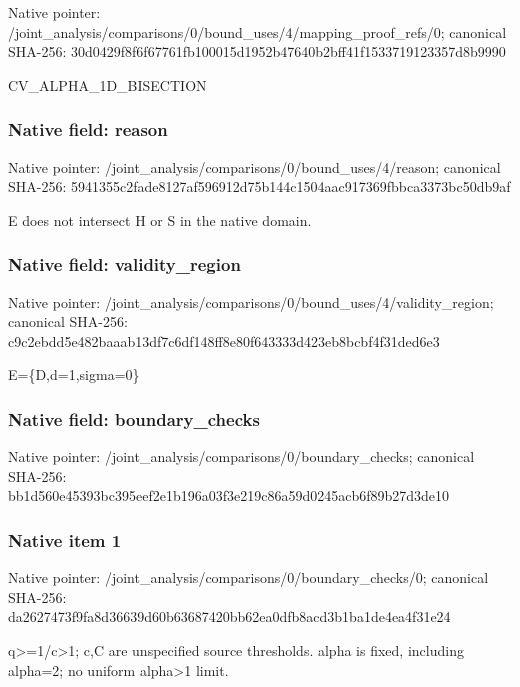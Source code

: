 \documentclass[10pt,a4paper]{article}
\begin{document}
Native pointer: /joint\_analysis/comparis\allowbreak{}ons/0/bound\_uses/4/mappi\allowbreak{}ng\_proof\_refs/0; canonical SHA-256: 30d0429f8f6f67761fb10001\allowbreak{}5d1952b47640b2bff41f1533\allowbreak{}719123357d8b9990


CV\_ALPHA\_1D\_BISECTION


\subsubsection{Native field: reason}


Native pointer: /joint\_analysis/comparis\allowbreak{}ons/0/bound\_uses/4/reaso\allowbreak{}n; canonical SHA-256: 5941355c2fade8127af59691\allowbreak{}2d75b144c1504aac917369fb\allowbreak{}bca3373bc50db9af


E does not intersect H or S in the native domain.


\subsubsection{Native field: validity\_region}


Native pointer: /joint\_analysis/comparis\allowbreak{}ons/0/bound\_uses/4/valid\allowbreak{}ity\_region; canonical SHA-256: c9c2ebdd5e482baaab13df7c\allowbreak{}6df148ff8e80f643333d423e\allowbreak{}b8bcbf4f31ded6e3


E=\{D,d=1,sigma=0\}


\subsubsection{Native field: boundary\_checks}


Native pointer: /joint\_analysis/comparis\allowbreak{}ons/0/boundary\_checks; canonical SHA-256: bb1d560e45393bc395eef2e1\allowbreak{}b196a03f3e219c86a59d0245\allowbreak{}acb6f89b27d3de10



\subsubsection{Native item 1}


Native pointer: /joint\_analysis/comparis\allowbreak{}ons/0/boundary\_checks/0; canonical SHA-256: da2627473f9fa8d36639d60b\allowbreak{}63687420bb62ea0dfb8acd3b\allowbreak{}1ba1de4ea4f31e24


q>=1/c>1; c,C are unspecified source thresholds. alpha is fixed, including alpha=2; no uniform alpha>1 limit.
\end{document}

